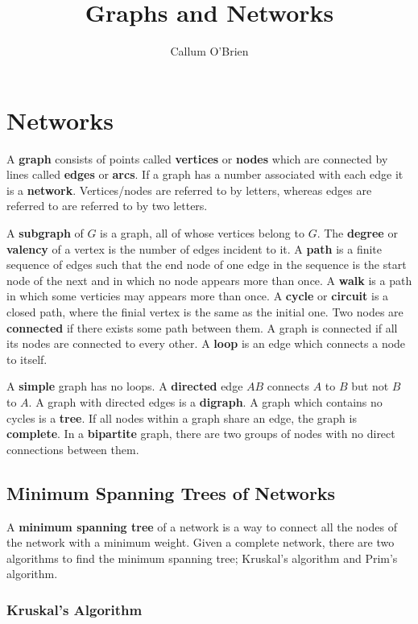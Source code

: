 \documentclass{article}
\title{Graphs and Networks}
\author{Callum O'Brien}
\date{}
\begin{document}
\maketitle
\tableofcontents
\newpage

\section{Networks}

A \textbf{graph} consists of points called \textbf{vertices} or \textbf{nodes} which are connected by lines called \textbf{edges} or \textbf{arcs}. If a graph has a number associated with each edge it is a \textbf{network}. Vertices/nodes are referred to by letters, whereas edges are referred to are referred to by two letters.

A \textbf{subgraph} of $G$ is a graph, all of whose vertices belong to $G$. The \textbf{degree} or \textbf{valency} of a vertex is the number of edges incident to it. A \textbf{path} is a finite sequence of edges such that the end node of one edge in the sequence is the start node of the next and in which no node appears more than once. A \textbf{walk} is a path in which some verticies may appears more than once. A \textbf{cycle} or \textbf{circuit} is a closed path, where the finial vertex is the same as the initial one. Two nodes are \textbf{connected} if there exists some path between them. A graph is connected if all its nodes are connected to every other. A \textbf{loop} is an edge which connects a node to itself.

A \textbf{simple} graph has no loops. A \textbf{directed} edge $AB$ connects $A$ to $B$ but not $B$ to $A$. A graph with directed edges is a \textbf{digraph}. A graph which contains no cycles is a \textbf{tree}. If all nodes within a graph share an edge, the graph is \textbf{complete}. In a \textbf{bipartite} graph, there are two groups of nodes with no direct connections between them.

\subsection{Minimum Spanning Trees of Networks}

A \textbf{minimum spanning tree} of a network is a way to connect all the nodes of the network with a minimum weight. Given a complete network, there are two algorithms to find the minimum spanning tree; Kruskal's algorithm and Prim's algorithm.

\subsubsection{Kruskal's Algorithm}
\end{document}
